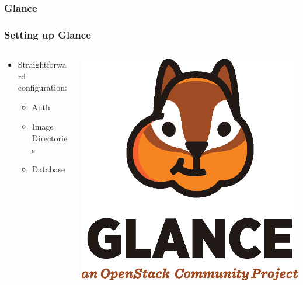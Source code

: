 \documentclass[aspectratio=169,11pt,hyperref={colorlinks=true}]{beamer}
\begin{document}
\subsubsection{Glance}
\begin{frame}
    \frametitle{Setting up Glance}
    \begin{columns}[T]
        \begin{column}{.48\textwidth}
            \begin{itemize}
                \item Straightforward configuration:
                    \begin{itemize}
                        \item Auth
                        \item Image Directories
                        \item Database
                    \end{itemize}
            \end{itemize}
        \end{column}
        \begin{column}{.48\textwidth}
            \includegraphics[width=\textwidth]{mascots/glance.eps}
        \end{column}
    \end{columns}
\end{frame}
\end{document}

